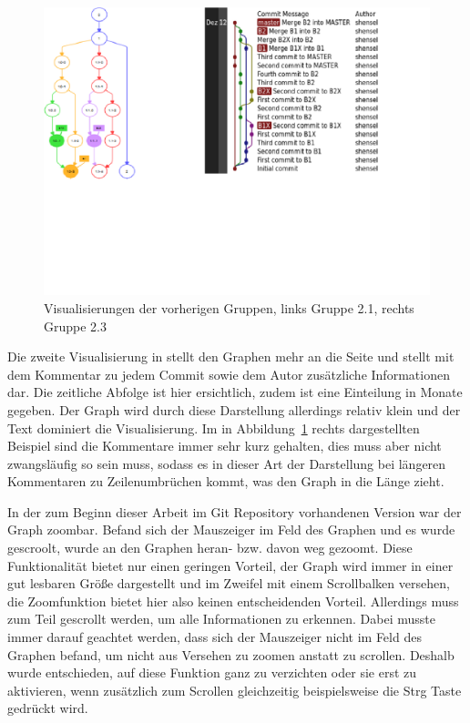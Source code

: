 \documentclass[nocolor]{tudbook}
\begin{document}
\begin{figure}[htbp] 
  \centering
     \includegraphics[width=1.2\textwidth]{Vorarbeiten.png}
  \caption[Visualisierungen der vorherigen Gruppen, links Gruppe 2.1 (aus \cite{Gruppe2.1}), rechts Gruppe 2.3 (aus \cite{Gruppe2.3})]{Visualisierungen der vorherigen Gruppen, links Gruppe 2.1, rechts Gruppe 2.3}
  \label{fig:Vorarbeiten}
\end{figure}

Die zweite Visualisierung in \cite{Gruppe2.3} stellt den Graphen mehr an die Seite und stellt mit dem Kommentar zu jedem Commit sowie dem Autor zusätzliche Informationen dar. Die zeitliche Abfolge ist hier ersichtlich, zudem ist eine Einteilung in Monate gegeben. Der Graph wird durch diese Darstellung allerdings relativ klein und der Text dominiert die Visualisierung. Im in Abbildung~\ref{fig:Vorarbeiten} rechts dargestellten Beispiel sind die Kommentare immer sehr kurz gehalten, dies muss aber nicht zwangsläufig so sein muss, sodass es in dieser Art der Darstellung bei längeren Kommentaren zu Zeilenumbrüchen kommt, was den Graph in die Länge zieht.  

In der zum Beginn dieser Arbeit im Git Repository vorhandenen Version war der Graph zoombar. Befand sich der Mauszeiger im Feld des Graphen und es wurde gescroolt, wurde an den Graphen heran- bzw. davon weg gezoomt. Diese Funktionalität bietet nur einen geringen Vorteil, der Graph wird immer in einer gut lesbaren Größe dargestellt und im Zweifel mit einem Scrollbalken versehen, die Zoomfunktion bietet hier also keinen entscheidenden Vorteil. Allerdings muss zum Teil gescrollt werden, um alle Informationen zu erkennen. Dabei musste immer darauf geachtet werden, dass sich der Mauszeiger nicht im Feld des Graphen befand, um nicht aus Versehen zu zoomen anstatt zu scrollen. Deshalb wurde entschieden, auf diese Funktion ganz zu verzichten oder sie erst zu aktivieren, wenn zusätzlich zum Scrollen gleichzeitig beispielsweise die \glqq Strg\grqq{} Taste gedrückt wird.
\end{document}
